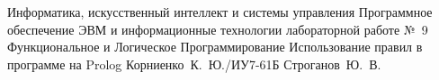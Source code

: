 \documentclass{bmstu}
\begin{document}
\makereporttitle
    {Информатика, искусственный интеллект и системы управления}
    {Программное обеспечение ЭВМ и информационные технологии}
    {лабораторной работе №~9}
    {Функциональное и Логическое Программирование}
    {Использование правил в программе на Prolog}
    {}
    {Корниенко~К.~Ю./ИУ7-61Б}
    {Строганов~Ю.~В.}


\end{document}
